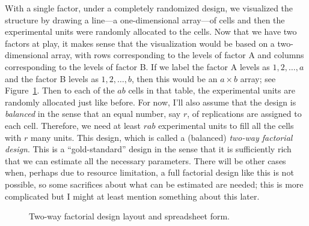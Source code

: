 \documentclass[a4paper, 12pt]{article}
\theoremstyle{plain}
\theoremstyle{definition}
\theoremstyle{remark}
\begin{document}
With a single factor, under a completely randomized design, we visualized the structure by drawing a line---a one-dimensional array---of cells and then the experimental units were randomly allocated to the cells.  Now that we have two factors at play, it makes sense that the visualization would be based on a two-dimensional array, with rows corresponding to the levels of factor A and columns corresponding to the levels of factor B.  If we label the factor A levels as $1,2,\ldots,a$ and the factor B levels as $1,2,\ldots,b$, then this would be an $a \times b$ array; see Figure~\ref{fig:twoway}.  Then to each of the $ab$ cells in that table, the experimental units are randomly allocated just like before.  For now, I'll also assume that the design is {\em balanced} in the sense that an equal number, say $r$, of replications are assigned to each cell.  Therefore, we need at least $rab$ experimental units to fill all the cells with $r$ many units.  This design, which is called a (balanced) {\em two-way factorial design}.  This is a ``gold-standard'' design in the sense that it is sufficiently rich that we can estimate all the necessary parameters.  There will be other cases when, perhaps due to resource limitation, a full factorial design like this is not possible, so some sacrifices about what can be estimated are needed; this is more complicated but I might at least mention something about this later.  

\begin{figure}[t]
\begin{center}
\end{center}
\caption{Two-way factorial design layout and spreadsheet form.}
\label{fig:twoway}
\end{figure}
\end{document}

